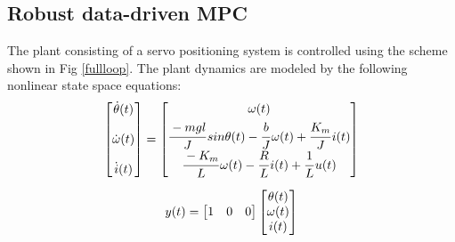 \documentclass[letterpaper, 10 pt, conference]{ieeeconf}  %
\begin{document}
	\subsection{Robust data-driven MPC }
	The plant consisting of a servo positioning system is controlled using the scheme shown in Fig \ref{fullloop}. The plant dynamics are modeled by the following nonlinear state space equations:
	\begin{equation*}
	\begin{matrix}
	\begin{bmatrix}
	\dot{\theta}(t) \vspace{12pt} \\
	\dot{\omega}(t) \vspace{12pt} \\
	\dot{i}(t)
	\end{bmatrix} = 
	\begin{bmatrix}
	\omega(t) \vspace{3pt}\\
	\cfrac{-mgl}{J}\hspace{1pt}sin\theta(t)-\cfrac{b}{J}\hspace{1pt}\omega(t) + \cfrac{K_m}{J}\hspace{1pt}i(t) \\  
	\cfrac{-K_m}{L}\hspace{1pt}\omega(t)-\cfrac{R}{L}\hspace{1pt}i(t) + \cfrac{1}{L}\hspace{1pt}u(t)
	\end{bmatrix} \vspace{10pt}\\
	y(t) = \begin{bmatrix} 1 & 0 & 0 \end{bmatrix} 
	\begin{bmatrix} \theta(t) \\ \omega(t) \\ i(t) \end{bmatrix} 
	\end{matrix}
	\end{equation*}
	
\end{document}
